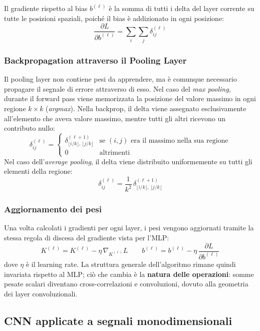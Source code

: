 Il gradiente rispetto al bias $b^{(\ell)}$ è la somma di tutti i delta del layer corrente su tutte le posizioni spaziali, poiché il bias è addizionato in ogni posizione:
\[
\frac{\partial L}{\partial b^{(\ell)}}= \sum_{i}\sum_{j}\delta^{(\ell)}_{ij}
\]

\subsubsection{Backpropagation attraverso il Pooling Layer}

Il pooling layer non contiene pesi da apprendere, ma è comunque necessario propagare il segnale di errore attraverso di esso. Nel caso del \emph{max pooling}, durante il forward pass viene memorizzata la posizione del valore massimo in ogni regione $k\times k$ (\textit{argmax}). Nella backprop, il delta viene assegnato esclusivamente all'elemento che aveva valore massimo, mentre tutti gli altri ricevono un contributo nullo:
\[
\delta^{(\ell)}_{ij}=
\begin{cases}
	\delta^{(\ell+1)}_{\lfloor i/k\rfloor,\,\lfloor j/k\rfloor}&\text{se }(i,j)\text{ era il massimo nella sua regione} \\
	0&\text{altrimenti}
\end{cases}
\]
Nel caso dell'\emph{average pooling}, il delta viene distribuito uniformemente su tutti gli elementi della regione:
\[
\delta^{(\ell)}_{ij} =\frac{1}{k^2}\,\delta^{(\ell+1)}_{\lfloor i/k\rfloor,\,\lfloor j/k\rfloor}
\]

\subsubsection{Aggiornamento dei pesi}

Una volta calcolati i gradienti per ogni layer, i pesi vengono aggiornati tramite la stessa regola di discesa del gradiente vista per l'MLP:
\[
K^{(\ell)}=K^{(\ell)}-\eta\,\nabla_{K^{(\ell)}}L \qquad b^{(\ell)}=b^{(\ell)}-\eta\,\frac{\partial L}{\partial b^{(\ell)}}
\]
dove $\eta$ è il learning rate. La struttura generale dell'algoritmo rimane quindi invariata rispetto al MLP; ciò che cambia è la \textbf{natura delle operazioni}: somme pesate scalari diventano cross-correlazioni e convoluzioni, dovuto alla geometria dei layer convoluzionali.

\subsection{CNN applicate a segnali monodimensionali}

